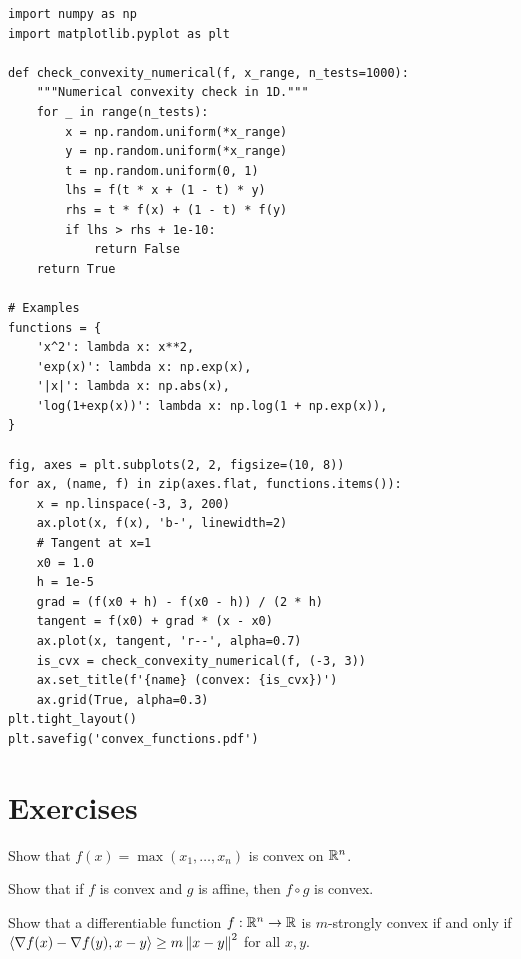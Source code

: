\begin{codeblock}[title=\textbf{Convexity verification and visualization}]
\begin{verbatim}
import numpy as np
import matplotlib.pyplot as plt

def check_convexity_numerical(f, x_range, n_tests=1000):
    """Numerical convexity check in 1D."""
    for _ in range(n_tests):
        x = np.random.uniform(*x_range)
        y = np.random.uniform(*x_range)
        t = np.random.uniform(0, 1)
        lhs = f(t * x + (1 - t) * y)
        rhs = t * f(x) + (1 - t) * f(y)
        if lhs > rhs + 1e-10:
            return False
    return True

# Examples
functions = {
    'x^2': lambda x: x**2,
    'exp(x)': lambda x: np.exp(x),
    '|x|': lambda x: np.abs(x),
    'log(1+exp(x))': lambda x: np.log(1 + np.exp(x)),
}

fig, axes = plt.subplots(2, 2, figsize=(10, 8))
for ax, (name, f) in zip(axes.flat, functions.items()):
    x = np.linspace(-3, 3, 200)
    ax.plot(x, f(x), 'b-', linewidth=2)
    # Tangent at x=1
    x0 = 1.0
    h = 1e-5
    grad = (f(x0 + h) - f(x0 - h)) / (2 * h)
    tangent = f(x0) + grad * (x - x0)
    ax.plot(x, tangent, 'r--', alpha=0.7)
    is_cvx = check_convexity_numerical(f, (-3, 3))
    ax.set_title(f'{name} (convex: {is_cvx})')
    ax.grid(True, alpha=0.3)
plt.tight_layout()
plt.savefig('convex_functions.pdf')
\end{verbatim}
\end{codeblock}

\section{Exercises}

\begin{exercise}[$\star$]
Show that $f(x) = \max(x_1, \ldots, x_n)$ is convex on $\mathbb{R}^n$.
\end{exercise}

\begin{exercise}[$\star$]
Show that if $f$ is convex and $g$ is affine, then $f \circ g$ is convex.
\end{exercise}

\begin{exercise}[$\star\star$]
Show that a differentiable function $f : \mathbb{R}^n \to \mathbb{R}$ is $m$-strongly convex if and
only if $\langle \nabla f(x) - \nabla f(y), x - y \rangle \geq m\left\| x - y \right\|^2$ for all $x, y$.
\end{exercise}

